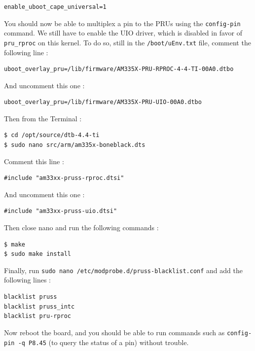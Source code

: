 \documentclass[]{report}
\begin{document}
\begin{verbatim}
enable_uboot_cape_universal=1
\end{verbatim}

You should now be able to multiplex a pin to the PRUs using the
\texttt{config-pin} command. We still
have to enable the UIO driver, which is disabled in favor of
\texttt{pru\_rproc} on this kernel. To do so, still in the
\texttt{/boot/uEnv.txt} file, comment the following line :

\begin{verbatim}
uboot_overlay_pru=/lib/firmware/AM335X-PRU-RPROC-4-4-TI-00A0.dtbo
\end{verbatim}

\noindent And uncomment this one :

\begin{verbatim}
uboot_overlay_pru=/lib/firmware/AM335X-PRU-UIO-00A0.dtbo
\end{verbatim}

\noindent Then from the Terminal :

\begin{verbatim}
$ cd /opt/source/dtb-4.4-ti
$ sudo nano src/arm/am335x-boneblack.dts
\end{verbatim}

\noindent Comment this line :

\begin{verbatim}
#include "am33xx-pruss-rproc.dtsi"
\end{verbatim}

\noindent And uncomment this one :

\begin{verbatim}
#include "am33xx-pruss-uio.dtsi"
\end{verbatim}

\noindent Then close nano and run the following commands :

\begin{verbatim}
$ make
$ sudo make install
\end{verbatim}

\noindent Finally, run
\texttt{sudo\ nano\ /etc/modprobe.d/pruss-blacklist.conf} and add the
following lines :

\begin{verbatim}
blacklist pruss
blacklist pruss_intc
blacklist pru-rproc
\end{verbatim}

\noindent Now reboot the board, and you should be able to run commands such as
\texttt{config-pin\ -q\ P8.45} (to query the status of a pin) without trouble.
\end{document}
